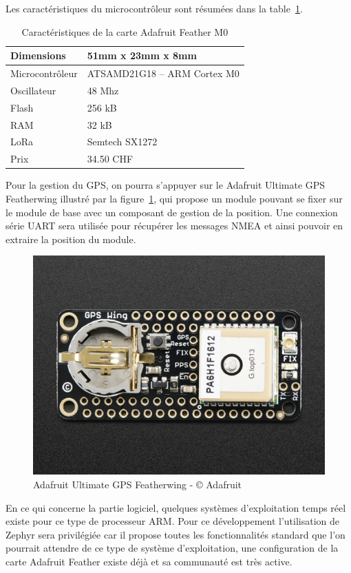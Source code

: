Les caractéristiques du microcontrôleur sont résumées dans la table~\ref{tab:ada_feather_cara}.

\begin{table}[htb]
\caption[Adafruit Feather Caractéristiques]{Caractéristiques de la carte Adafruit Feather M0}
\label{tab:ada_feather_cara}
\centering
\begin{tabular}{ l | l }
\toprule
Dimensions & 51mm x 23mm x 8mm \\
\midrule
Microcontrôleur & ATSAMD21G18 – ARM Cortex M0 \\
\midrule
Oscillateur & 48 Mhz \\
\midrule
Flash & 256 kB \\
\midrule
RAM & 32 kB \\
\midrule
LoRa & Semtech SX1272 \\
\midrule
Prix & 34.50 CHF\\
\bottomrule 
\end{tabular}
\end{table}

Pour la gestion du GPS, on pourra s’appuyer sur le Adafruit Ultimate GPS Featherwing illustré par la figure~\ref{fig:ada_featherwing_gps}, qui propose un module pouvant se fixer sur le module de base avec un composant de gestion de la position. Une connexion série UART sera utilisée pour récupérer les messages NMEA et ainsi pouvoir en extraire la position du module.

\begin{figure}[htb]
\centering 
\includegraphics[width=0.4\columnwidth]{../images/adafruit-featherwing-ultimate-gps.jpg} 
\caption[Adafruit Featherwing GPS]{Adafruit Ultimate GPS Featherwing - © Adafruit}
\label{fig:ada_featherwing_gps}
\end{figure}

En ce qui concerne la partie logiciel, quelques systèmes d’exploitation temps réel existe pour ce type de processeur ARM. Pour ce développement l’utilisation de Zephyr sera privilégiée car il propose toutes les fonctionnalités standard que l’on pourrait attendre de ce type de système d’exploitation, une configuration de la carte Adafruit Feather existe déjà et sa communauté est très active.

